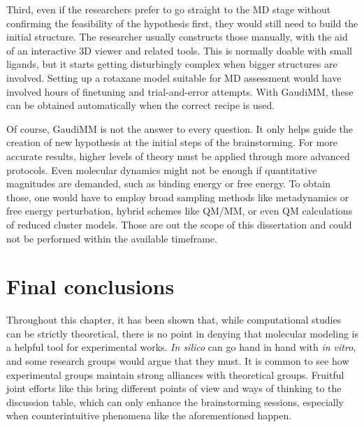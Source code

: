 Third, even if the researchers prefer to go straight to the MD stage without confirming the feasibility of the hypothesis first, they would still need to build the initial structure. The researcher usually constructs those manually, with the aid of an interactive 3D viewer and related tools. This is normally doable with small ligands, but it starts getting disturbingly complex when bigger structures are involved. Setting up a rotaxane model suitable for MD assessment would have involved hours of finetuning and trial-and-error attempts. With GaudiMM, these can be obtained automatically when the correct recipe is used.

Of course, GaudiMM is not the answer to every question. It only helps guide the creation of new hypothesis at the initial steps of the brainstorming. For more accurate results, higher levels of theory must be applied through more advanced protocols. Even molecular dynamics might not be enough if quantitative magnitudes are demanded, such as binding energy or free energy. To obtain those, one would have to employ broad sampling methods like metadynamics or free energy perturbation, hybrid schemes like QM/MM, or even QM calculations of reduced cluster models. Those are out the scope of this dissertation and could not be performed within the available timeframe.

\section{Final conclusions}
Throughout this chapter, it has been shown that, while computational studies can be strictly theoretical, there is no point in denying that molecular modeling is a helpful tool for experimental works. \textit{In silico} can go hand in hand with \textit{in vitro}, and some research groups would argue that they must. It is common to see how experimental groups maintain strong alliances with theoretical groups. Fruitful joint efforts like this bring different points of view and ways of thinking to the discussion table, which can only enhance the brainstorming sessions, especially when counterintuitive phenomena like the aforementioned happen.

